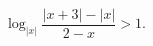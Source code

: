 \begin{ex}[type=inequality]
	\begin{condition}
		$\log_{|x|}\dfrac{\big|x + 3\big| - \big|x\big|}{2 - x}>1  .$
	\end{condition}
\end{ex}